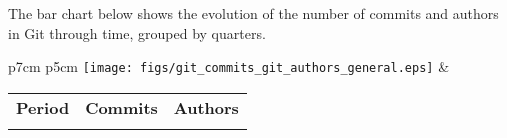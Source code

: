 The bar chart below shows the evolution of the number of commits and authors in Git through time, grouped by quarters.


\begin{tabular}{p{7cm} p{5cm}}
	\vspace{0pt} 
	\texttt{[image: figs/git\_commits\_git\_authors\_general.eps]}
	& 
	\vspace{0pt}
	\begin{tabular}{l|r|r|}
		\bfseries Period & \bfseries Commits & \bfseries Authors
		\csvreader[head to column names]{data/git_commits_git_authors_general.csv}{}
		{\\ & \commits & \authors}
	\end{tabular}
\end{tabular}



